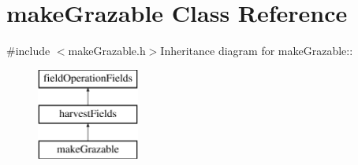 \hypertarget{classmake_grazable}{
\section{makeGrazable Class Reference}
\label{classmake_grazable}
}


{\ttfamily \#include $<$makeGrazable.h$>$}Inheritance diagram for makeGrazable::\begin{figure}[H]
\begin{center}
\leavevmode
\includegraphics[height=3cm]{classmake_grazable}
\end{center}
\end{figure}
